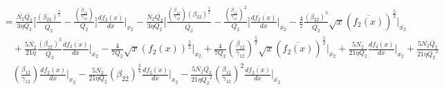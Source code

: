 \documentclass[fleqn, 10pt]{article}
\begin{document}
            \begin{equation*}
            \begin{split}
            &= \frac{\overline{N_2}\overline{Q_2}}{3\eta Q_2} \biggl[\frac{(\beta_{2\overline{2}})^\frac{3}{2}}{\overline{Q_2}} -   \frac{\left(\frac{\beta_{1\overline{2}}}{\gamma_{12}}\right)}{Q_2} \biggr] \frac{df_2(x)}{dx} \Bigg|_{x_2} - \frac{\overline{N_2}\overline{Q_2}}{3\eta Q_2} \biggl[ \frac{\left(\frac{\beta_{1\overline{2}}}{\gamma_{12}}\right)(\beta_{2\overline{2}})^\frac{3}{2}}{\overline{Q_2}} -  \frac{\left(\frac{\beta_{1\overline{2}}}{\gamma_{12}}\right)^2}{Q_2} \biggr]\frac{d\overline{f_2(x)}}{dx}\Bigg|_{\overline{x_2}} -   \frac{4}{7} \frac{(\beta_{2\overline{2}})^3}{\overline{Q_2}}\sqrt{x} (\overline{f_2(x)})^\frac{5}{2} \Bigg|_{\overline{x_2}} \\ & \quad +  \frac{5\overline{N_2}}{21 \eta} \frac{(\beta_{2\overline{2}})^3}{\overline{Q_2}}\frac{d\overline{f_2(x)}}{dx}\Bigg|_{\overline{x_2}} -   \frac{4}{7Q_2} \sqrt{x}(f_2(x))^\frac{5}{2}\Bigg|_{x_2} +   \frac{4}{7Q_2} \left(\frac{\beta_{1\overline{2}}}{\gamma_{12}}\right)^\frac{5}{2} \sqrt{x} (\overline{f_2(x)})^\frac{5}{2}\Bigg|_{\overline{x_2}} +   \frac{5N_2}{21\eta Q_2} \frac{df_2(x)}{dx} \Bigg|_{x_2} +  \frac{5 \overline{N_2} \overline{Q_2}}{21 \eta {Q_2}^2} \\ & \quad \left(\frac{\beta_{1\overline{2}}}{\gamma_{12}}\right) \frac{df_2(x)}{dx} \Bigg|_{x_2} -   \frac{5 \overline{N_2}}{21 \eta Q_2} (\beta_{2\overline{2}})^\frac{3}{2} \frac{df_2(x)}{dx} \Bigg|_{x_2} -   \frac{5 \overline{N_2} \overline{Q_2}}{21 \eta {Q_2}^2} \left(\frac{\beta_{1\overline{2}}}{\gamma_{12}}\right)^2 \frac{d\overline{f_2(x)}}{dx} \Bigg|_{\overline{x_2}}
            \end{split}
            \end{equation*}
\end{document}
